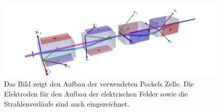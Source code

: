 \begin{figure}[h]
	\centering
	\includegraphics[scale=0.7]{Bilder/kristalle}
	\caption[Aufbau der Pockels Zelle]{\small Das Bild zeigt den Aufbau der verwendeten Pockels Zelle. Die Elektroden für den Aufbau der elektrischen Felder sowie die Strahlenverläufe sind auch eingezeichnet.}
	\label{kristalle}
\end{figure}
